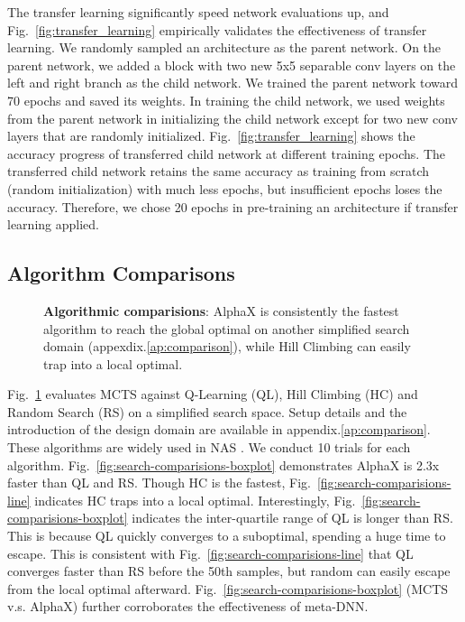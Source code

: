 \documentclass[10pt,twocolumn,letterpaper]{article}
\begin{document}
The transfer learning significantly speed network evaluations up, and Fig.~\ref{fig:transfer_learning} empirically validates the effectiveness of transfer learning. 
We randomly sampled an architecture as the parent network. On the parent network, we added a block with two new 5x5 separable conv layers on the left and right branch as the child network. We trained the parent network toward 70 epochs and saved its weights. In training the child network, we used weights from the parent network in initializing the child network except for two new conv layers that are randomly initialized. Fig.~\ref{fig:transfer_learning} shows the accuracy progress of transferred child network at different training epochs. The transferred child network retains the same accuracy as training from scratch (random initialization) with much less epochs, but insufficient epochs loses the accuracy. Therefore, we chose 20 epochs in pre-training an architecture if transfer learning applied.  


\subsection{Algorithm Comparisons}
\label{alg-comps-sec}

  \begin{figure}[t]
    \begin{center}
  	    \quad
    \end{center}
	\vspace{-0.2in}
    \caption{\textbf{Algorithmic comparisions}: AlphaX is consistently the fastest algorithm to reach the global optimal on another simplified search domain (appexdix.\ref{ap:comparison}), while Hill Climbing can easily trap into a local optimal.  }
    \label{fig:alg_comps}
  \end{figure}

Fig.~\ref{fig:alg_comps} evaluates MCTS against Q-Learning (QL), Hill Climbing (HC) and Random Search (RS) on a simplified search space. Setup details and the introduction of the design domain are available in appendix.\ref{ap:comparison}. These algorithms are widely used in NAS \cite{Baker2016, Liu2017, elsken2017simple, greff2017lstm}. We conduct 10 trials for each algorithm. Fig.~\ref{fig:search-comparisions-boxplot} demonstrates AlphaX is 2.3x faster than QL and RS. Though HC is the fastest, Fig.~\ref{fig:search-comparisions-line} indicates HC traps into a local optimal. Interestingly, Fig.~\ref{fig:search-comparisions-boxplot} indicates the inter-quartile range of QL is longer than RS. This is because QL quickly converges to a suboptimal, spending a huge time to escape. This is consistent with Fig.~\ref{fig:search-comparisions-line} that QL converges faster than RS before the 50th samples, but random can easily escape from the local optimal afterward. Fig.~\ref{fig:search-comparisions-boxplot} (MCTS v.s. AlphaX) further corroborates the effectiveness of meta-DNN.
\end{document}
